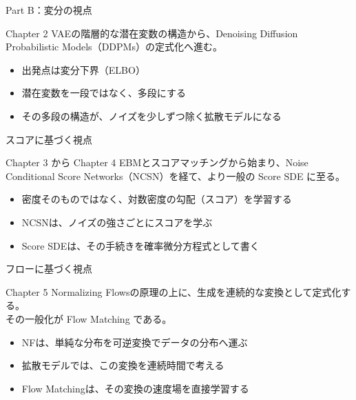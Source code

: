 \begin{frame}{Part B：変分の視点}
    \begin{block}{Chapter 2}
        VAEの階層的な潜在変数の構造から、Denoising Diffusion Probabilistic Models（DDPMs）の定式化へ進む。
    \end{block}
    \vspace{0.8em}
    \begin{itemize}
        \item 出発点は変分下界（ELBO）
        \item 潜在変数を一段ではなく、多段にする
        \item その多段の構造が、ノイズを少しずつ除く拡散モデルになる
    \end{itemize}
\end{frame}
\begin{frame}{スコアに基づく視点}
    \begin{block}{Chapter 3 から Chapter 4}
        EBMとスコアマッチングから始まり、Noise Conditional Score Networks（NCSN）を経て、より一般の Score SDE に至る。
    \end{block}
    \vspace{0.8em}
    \begin{itemize}
        \item 密度そのものではなく、対数密度の勾配（スコア）を学習する
        \item NCSNは、ノイズの強さごとにスコアを学ぶ
        \item Score SDEは、その手続きを確率微分方程式として書く
    \end{itemize}
\end{frame}
\begin{frame}{フローに基づく視点}
    \begin{block}{Chapter 5}
        Normalizing Flowsの原理の上に、生成を連続的な変換として定式化する。\\
        その一般化が Flow Matching である。
    \end{block}
    \vspace{0.8em}
    \begin{itemize}
        \item NFは、単純な分布を可逆変換でデータの分布へ運ぶ
        \item 拡散モデルでは、この変換を連続時間で考える
        \item Flow Matchingは、その変換の速度場を直接学習する
    \end{itemize}
\end{frame}
